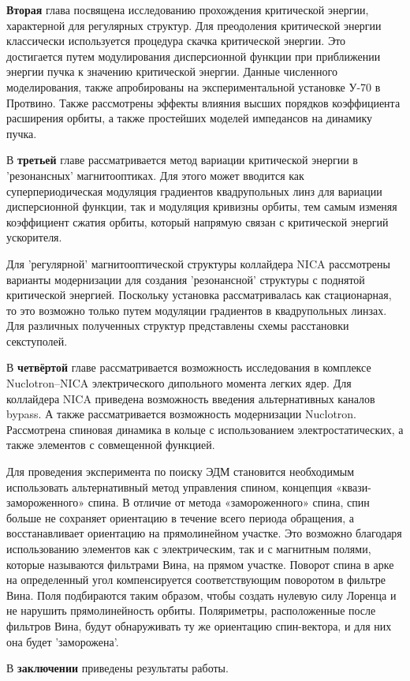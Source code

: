 \textbf{Вторая} глава посвящена исследованию прохождения критической энергии, характерной для регулярных структур. Для преодоления критической энергии классически используется процедура скачка критической энергии. Это достигается путем модулирования дисперсионной функции при приближении энергии пучка к значению критической энергии. Данные численного моделирования, также апробированы на экспериментальной установке У-70 в Протвино. Также рассмотрены эффекты влияния высших порядков коэффициента расширения орбиты, а также простейших моделей импедансов на динамику пучка.

В \textbf{третьей} главе рассматривается метод вариации критической энергии в 'резонансных' магнитооптиках. Для этого может вводится как суперпериодическая модуляция градиентов квадрупольных линз для вариации дисперсионной функции, так и модуляция кривизны орбиты, тем самым изменяя коэффициент сжатия орбиты, который напрямую связан с критической энергий ускорителя.

\par Для 'регулярной' магнитооптической структуры коллайдера NICA рассмотрены варианты модернизации для создания 'резонансной' структуры с поднятой критической энергией. Поскольку установка рассматривалась как стационарная, то это возможно только путем модуляции градиентов в квадрупольных линзах. Для различных полученных структур представлены схемы расстановки секступолей.

В \textbf{четвёртой} главе рассматривается возможность исследования в комплексе Nuclotron–NICA электрического дипольного момента легких ядер. Для коллайдера NICA приведена возможность введения альтернативных каналов bypass. А также рассматривается возможность модернизации Nuclotron. Рассмотрена спиновая динамика в кольце с использованием электростатических, а также элементов с совмещенной функцией.

\par Для проведения эксперимента по поиску ЭДМ становится необходимым использовать альтернативный метод управления спином, концепция «квази-замороженного» спина. В отличие от метода «замороженного» спина, спин больше не сохраняет ориентацию в течение всего периода обращения, а восстанавливает ориентацию на прямолинейном участке. Это возможно благодаря использованию элементов как с электрическим, так и с магнитным полями, которые называются фильтрами Вина, на прямом участке. Поворот спина в арке на определенный угол компенсируется соответствующим поворотом в фильтре Вина. Поля подбираются таким образом, чтобы создать нулевую силу Лоренца и не нарушить прямолинейность орбиты. Поляриметры, расположенные после фильтров Вина, будут обнаруживать ту же ориентацию спин-вектора, и для них она будет 'заморожена'.

В \textbf{заключении} приведены результаты работы.